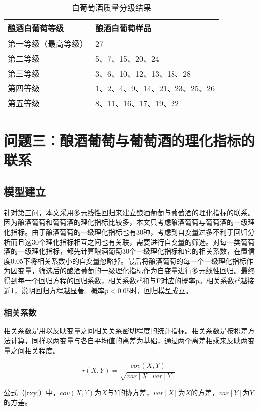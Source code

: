 \documentclass[withoutpreface,bwprint]{cumcmthesis} %
\begin{document}
\begin{table}[!htbp]
\centering
\caption{白葡萄酒质量分级结果}
\label{白葡萄酒质量分级结果}
\begin{tabular}{ll}
\toprule
酿酒白葡萄等级&酿酒白葡萄样品\\
\midrule
第一等级（最高等级）&27\\
第二等级&5、7、15、20、24\\
第三等级&3、6、10、12、13、18、28\\
第四等级&1、2、4、9、14、21、23、25、26\\
第五等级&8、11、16、17、19、22\\
\bottomrule 
\end{tabular}
\end{table}



\newpage
\section{问题三：酿酒葡萄与葡萄酒的理化指标的联系}
\subsection{模型建立}
\par 针对第三问，本文采用多元线性回归来建立酿酒葡萄与葡萄酒的理化指标的联系。因为酿酒葡萄和葡萄酒的理化指标比较多，本文只考虑酿酒葡萄与葡萄酒的一级理化指标。由于酿酒葡萄的一级理化指标也有30种，考虑到自变量过多不利于回归分析而且这30个理化指标相互之间也有关联，需要进行自变量的筛选。对每一类葡萄酒的一级理化指标，都先计算酿酒葡萄30个一级理化指标和它的相关系数，在置信度0.05下将相关系数小的自变量忽略掉。最后将酿酒葡萄的每一个一级理化指标作为因变量，筛选后的酿酒葡萄的一级理化指标作为自变量进行多元线性回归。最终得到每一个回归方程的回归系数，相关系数$r^2$和与F对应的概率p。相关系数$r^2$越接近1，说明回归方程越显著。概率$p<0.05$时，回归模型成立。
\subsubsection{相关系数}
\par 相关系数是用以反映变量之间相关关系密切程度的统计指标。相关系数是按积差方法计算，同样以两变量与各自平均值的离差为基础，通过两个离差相乘来反映两变量之间相关程度。

\begin{equation}
	\label{rxy}
	r(X,Y) = \frac{cov(X,Y)}{\sqrt{var[X]var[Y]}}
\end{equation}

公式（\ref{rxy}）中，$cov(X,Y)$为$X$与$Y$的协方差，$var[X]$为$X$的方差，$var[Y]$为$Y$的方差。
\end{document}
